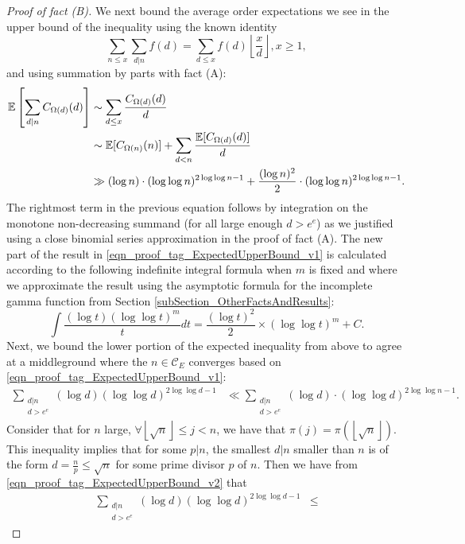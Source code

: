 \documentclass[11pt,reqno,a4letter]{article}
\numberwithin{figure}{section}
\numberwithin{table}{section}
\newcommand{\floor}[1]{\left\lfloor #1 \right\rfloor}
\newcommand{\Floor}[2]{\ensuremath{\left\lfloor \frac{#1}{#2} \right\rfloor}}
\theoremstyle{plain}
\numberwithin{theorem}{section}
\theoremstyle{definition}
\begin{document}
\begin{proof}[Proof of fact (B)]
We next bound the average order expectations we see in the upper bound of the 
inequality using the known identity 
\[
\sum_{n \leq x} \sum_{d|n} f(d) = \sum_{d \leq x} f(d) \Floor{x}{d}, x \geq 1, 
\]
and using summation by parts with fact (A): 
\begin{align} 
\notag 
\mathbb{E}\left[\sum_{d|n} C_{\Omega(d)}(d)\right] & \sim \sum_{d \leq x} \frac{C_{\Omega(d)}(d)}{d} \\ 
\notag 
     & \sim \mathbb{E}[C_{\Omega(n)}(n)] + \sum_{d<n} \frac{\mathbb{E}[C_{\Omega(d)}(d)]}{d} \\ 
\label{eqn_proof_tag_ExpectedUpperBound_v1} 
     & \gg (\log n) \cdot (\log\log n)^{2\log\log n - 1} + \frac{(\log n)^2}{2} \cdot (\log\log n)^{2\log\log n - 1}. 
\end{align} 
The rightmost term in the previous equation follows by integration on the monotone non-decreasing 
summand (for all large enough $d > e^e$) as we justified using a close binomial series 
approximation in the proof of fact (A). 
The new part of the result in \eqref{eqn_proof_tag_ExpectedUpperBound_v1} 
is calculated according to the 
following indefinite integral formula when $m$ is fixed and where we approximate the result 
using the asymptotic formula for the incomplete gamma function from 
Section \ref{subSection_OtherFactsAndResults}:  
\[
\int \frac{(\log t) (\log\log t)^{m}}{t} dt = \frac{(\log t)^2}{2} \times (\log\log t)^m + C. 
\]
Next, we bound the lower portion of the expected inequality from above to agree at a middleground 
where the $n \in \mathcal{C}_E$ converges based on \eqref{eqn_proof_tag_ExpectedUpperBound_v1}: 
\begin{align} 
\label{eqn_proof_tag_ExpectedUpperBound_v2} 
\sum_{\substack{d|n \\ d > e^e}} (\log d) (\log\log d)^{2 \log\log d - 1} & \ll 
     \sum_{\substack{d|n \\ d > e^e}} (\log d) \cdot (\log\log d)^{2\log\log n - 1}. 
\end{align} 
Consider that for $n$ large, $\forall \floor{\sqrt{n}} \leq j < n$, we have that 
$\pi(j) = \pi(\floor{\sqrt{n}})$. 
This inequality implies that for some $p|n$, the smallest $d|n$ smaller than $n$ is of the form 
$d = \frac{n}{p} \leq \sqrt{n}$ for some prime divisor $p$ of $n$. Then we have from 
\eqref{eqn_proof_tag_ExpectedUpperBound_v2} that 
\begin{align} 
\label{eqn_proof_tag_ExpectedUpperBound_v3} 
\sum_{\substack{d|n \\ d > e^e}} (\log d) (\log\log d)^{2 \log\log d - 1} & \leq 

\end{align}
\end{proof}
\end{document}
